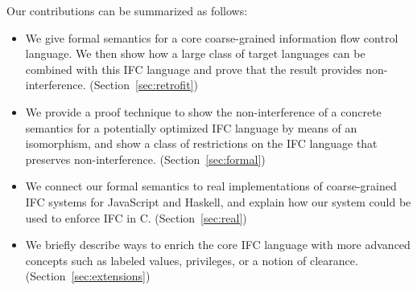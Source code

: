 Our contributions can be summarized as follows:
\begin{itemize}
  \item We give formal semantics for a core coarse-grained
  information flow control language.
  We then show how a large class of target languages can be combined
  with this IFC language and prove that the result provides
  non-interference. (Section~\ref{sec:retrofit})
  \item We provide a proof technique to show the non-interference
  of a concrete semantics for a potentially optimized IFC language
  by means of an isomorphism, and show a class of restrictions on
  the IFC language that preserves non-interference. (Section~\ref{sec:formal})
  \item We connect our formal semantics to real implementations of
  coarse-grained IFC systems for JavaScript and Haskell, and explain
  how our system could be used to enforce IFC in C. (Section~\ref{sec:real})
  \item We briefly describe ways to enrich the core IFC language with
  more advanced concepts such as labeled values, privileges, or a
  notion of clearance. (Section~\ref{sec:extensions})
\end{itemize}

